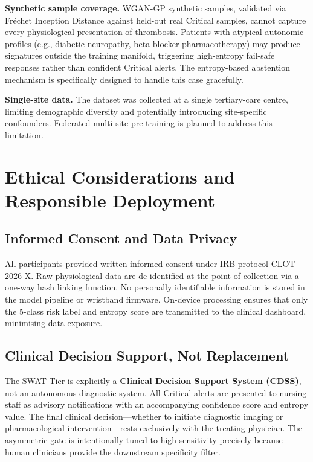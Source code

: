 \documentclass[conference]{IEEEtran}
\begin{document}
\textbf{Synthetic sample coverage.}  WGAN-GP synthetic samples,
validated via Fréchet Inception Distance against held-out real Critical
samples, cannot capture every physiological presentation of
thrombosis.  Patients with atypical autonomic profiles (e.g., diabetic
neuropathy, beta-blocker pharmacotherapy) may produce signatures
outside the training manifold, triggering high-entropy fail-safe
responses rather than confident Critical alerts.  The entropy-based
abstention mechanism is specifically designed to handle this case
gracefully.

\textbf{Single-site data.}  The dataset was collected at a single
tertiary-care centre, limiting demographic diversity and potentially
introducing site-specific confounders.  Federated multi-site
pre-training is planned to address this limitation.

\section{Ethical Considerations and Responsible Deployment}

\subsection{Informed Consent and Data Privacy}
All participants provided written informed consent under IRB protocol
CLOT-2026-X.  Raw physiological data are de-identified at the point of
collection via a one-way hash linking function.  No personally
identifiable information is stored in the model pipeline or wristband
firmware.  On-device processing ensures that only the 5-class risk
label and entropy score are transmitted to the clinical dashboard,
minimising data exposure.

\subsection{Clinical Decision Support, Not Replacement}
The SWAT Tier is explicitly a \textbf{Clinical Decision Support System
(CDSS)}, not an autonomous diagnostic system.  All Critical alerts are
presented to nursing staff as advisory notifications with an
accompanying confidence score and entropy value.  The final clinical
decision---whether to initiate diagnostic imaging or pharmacological
intervention---rests exclusively with the treating physician.  The
asymmetric gate is intentionally tuned to high sensitivity precisely
because human clinicians provide the downstream specificity filter.
\end{document}
